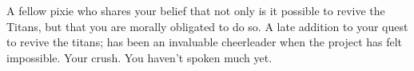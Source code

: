 \documentclass[char]{PP}
\begin{document}
\begin{itemz}[Notes]
	\item 
\end{itemz}

\begin{contacts}
	\contact{\cFTitan{}} A fellow pixie who shares your belief that not only is it possible to revive the Titans, but that you are morally obligated to do so.
	\contact{\cEAirship{}} A late addition to your quest to revive the titans; \cEAirship{} has been an invaluable cheerleader when the project has felt impossible.
	\contact{\cMAirship{}} Your crush. You haven’t spoken much yet.
\end{contacts}
\end{document}
